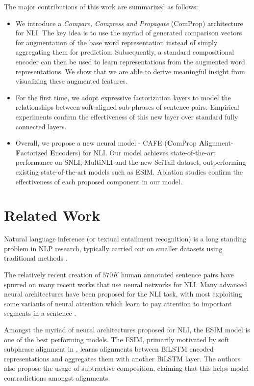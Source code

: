 \documentclass[11pt,a4paper]{article}
\begin{document}
The major contributions of this work are summarized as follows:
\begin{itemize}
\item We introduce a \textit{Compare, Compress and Propagate} (ComProp) architecture for NLI. The key idea is to use the myriad of generated comparison vectors for augmentation of the base word representation instead of simply aggregating them for prediction. Subsequently, a standard compositional encoder can then be used to learn representations from the augmented word representations. We show that we are able to derive meaningful insight from visualizing these augmented features.
\item For the first time, we adopt expressive factorization layers to model the relationships between soft-aligned sub-phrases of sentence pairs. Empirical experiments confirm the effectiveness of this new layer over standard fully connected layers.
\item Overall, we propose a new neural model - \textsc{CAFE} (\textbf{C}omProp \textbf{A}lignment-\textbf{F}actorized \textbf{E}ncoders) for NLI. Our model achieves state-of-the-art performance on SNLI, MultiNLI and the new SciTail dataset, outperforming existing state-of-the-art models such as ESIM. Ablation studies confirm the effectiveness of each proposed component in our model.
\end{itemize}

\section{Related Work}

Natural language inference (or textual entailment recognition) is a long standing problem in NLP research, typically carried out on smaller datasets using
traditional methods \cite{Maccartney:2009:NLI:1751277,Dagan:2005:PRT:2100045.2100054,MacCartney:2008:MSC:1599081.1599147,Iftene:2007:HTS:1654536.1654562}.

The relatively recent creation of $570K$ human annotated sentence pairs \cite{DBLP:conf/emnlp/BowmanAPM15} have spurred on many recent works that use neural networks for NLI. Many advanced neural architectures have been proposed for the NLI task, with most exploiting some variants of neural attention which learn to pay attention to important segments in a sentence \cite{DBLP:conf/emnlp/ParikhT0U16,DBLP:conf/acl/ChenZLWJI17,DBLP:conf/naacl/WangJ16,rocktaschel2015reasoning,DBLP:conf/eacl/YuM17a}.

Amongst the myriad of neural architectures proposed for NLI, the ESIM \cite{DBLP:conf/acl/ChenZLWJI17} model is one of the best performing models. The ESIM, primarily motivated by soft subphrase alignment in \cite{DBLP:conf/emnlp/ParikhT0U16}, learns alignments between BiLSTM encoded representations and aggregates them with another BiLSTM layer. The authors also propose the usage of subtractive composition, claiming that this helps model contradictions amongst alignments.
\end{document}
